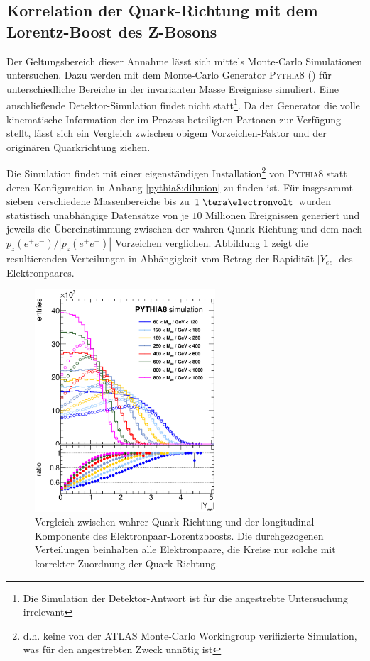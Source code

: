\subsection{Korrelation der Quark-Richtung mit dem Lorentz-Boost des Z-Bosons}
\label{afb:dilution}
Der Geltungsbereich dieser Annahme lässt sich mittels Monte-Carlo Simulationen
untersuchen. Dazu werden mit dem Monte-Carlo Generator \textsc{Pythia8}
(\cite{Sjostrand:2007gs}) für unterschiedliche Bereiche in der invarianten
Masse Ereignisse simuliert. Eine anschließende Detektor-Simulation findet nicht
statt\footnote{Die Simulation der Detektor-Antwort ist für die angestrebte
Untersuchung irrelevant}. Da der Generator die volle kinematische Information
der im Prozess beteiligten Partonen zur Verfügung stellt, lässt sich ein
Vergleich zwischen obigem Vorzeichen-Faktor und der originären Quarkrichtung
ziehen.

Die Simulation findet mit einer eigenständigen Installation\footnote{d.h. keine
von der ATLAS Monte-Carlo Workingroup verifizierte Simulation, was für den
angestrebten Zweck unnötig ist} von \textsc{Pythia8} statt deren
Konfiguration in Anhang \ref{pythia8:dilution} zu finden ist. Für insgesammt
sieben verschiedene Massenbereiche bis zu $1 \TeV$ wurden statistisch
unabhängige Datensätze von je $10$ Millionen Ereignissen generiert und jeweils
die Übereinstimmung zwischen der wahren Quark-Richtung und dem nach
$p_z(e^+e^-)/|p_z(e^+e^-)|$ Vorzeichen verglichen. Abbildung \ref{fig:dilution}
zeigt die resultierenden Verteilungen in Abhängigkeit vom Betrag der Rapidität
$|Y_{ee}|$ des Elektronpaares.

\begin{figure}[h]
    \centering
    \includegraphics[width=0.6\textwidth]{plots/dilution}
    \caption[Vergleich zwischen Quark-Richtung und long. Komponente des
        Z-Boosts]
        {Vergleich zwischen wahrer Quark-Richtung und der longitudinal
        Komponente des Elektronpaar-Lorentzboosts. Die durchgezogenen
        Verteilungen beinhalten alle Elektronpaare, die Kreise nur solche mit
        korrekter Zuordnung der Quark-Richtung.}
    \label{fig:dilution}
\end{figure}

